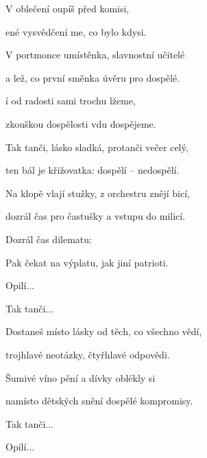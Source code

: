 

\zs
V  oblečení oupíš před komisi,

ené vysvědčení me, co bylo kdysi.
\ks

\zs
V portmonce umístěnka, slavnostní učitelé

a lež, co první směnka úvěru pro dospělé.
\ks

\zr
{}í od radosti  sami trochu lžeme,

 zkouškou dospělosti vdu dospějeme.
\kr

\zr
Tak tanči, lásko sladká, protanči večer celý,

ten bál je křižovatka: dospělí -- nedospělí.
\kr

\zs
Na klopě vlají stužky, z orchestru znějí bicí,

dozrál čas pro častušky a vstupu do milicí.
\ks

\zs
Dozrál čas dilematu: 

Pak čekat na výplatu, jak jiní patrioti.
\ks

\zr Opilí... \kr

\zr Tak tanči... \kr

\zs
Dostaneš místo lásky od těch, co všechno vědí,

trojhlavé neotázky, čtyřhlavé odpovědi.
\ks

\zr
Šumivé víno pění a dívky oblékly si

namísto dětských snění dospělé kompromisy.
\kr

\zr Tak tanči... \kr

\zr Opilí... \kr

\kp


















